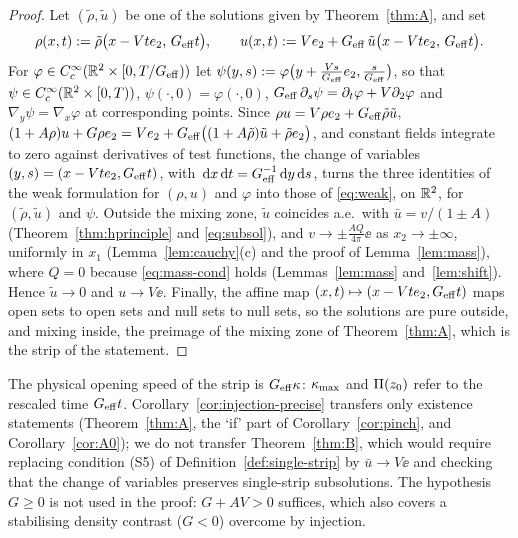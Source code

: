 \begin{proof}
Let $(\tilde\rho,\tilde u)$ be one of the solutions given by Theorem~\ref{thm:A}, and set
\[
\rho(x,t):=\tilde\rho\big(x-Vte_2,\,G_{\rm eff}t\big),\qquad u(x,t):=Ve_2+G_{\rm eff}\,\tilde u\big(x-Vte_2,\,G_{\rm eff}t\big).
\]
For $\varphi\in C^\infty_c(\mathbb{R}^2\times[0,T/G_{\rm eff}))$ let $\psi(y,s):=\varphi\big(y+\frac{Vs}{G_{\rm eff}}e_2,\frac{s}{G_{\rm eff}}\big)$, so that $\psi\in C^\infty_c(\mathbb{R}^2\times[0,T))$,
$\psi(\cdot,0)=\varphi(\cdot,0)$, $G_{\rm eff}\,\partial_s\psi=\partial_t\varphi+V\partial_2\varphi$ and $\nabla_y\psi=\nabla_x\varphi$ at corresponding points. Since $\rho u=V\rho e_2+G_{\rm eff}\tilde\rho\tilde u$,
$(1+A\rho)u+G\rho e_2=Ve_2+G_{\rm eff}\big((1+A\tilde\rho)\tilde u+\tilde\rho e_2\big)$, and constant fields integrate to zero against derivatives of test functions, the change of variables
$(y,s)=(x-Vte_2,G_{\rm eff}t)$, with $\,\mathrm{d} x\,\mathrm{d} t=G_{\rm eff}^{-1}\,\mathrm{d} y\,\mathrm{d} s$, turns the three identities of the weak formulation for $(\rho,u)$ and $\varphi$ into those of \eqref{eq:weak}, on $\mathbb{R}^2$, for
$(\tilde\rho,\tilde u)$ and $\psi$. Outside the mixing zone, $\tilde u$ coincides a.e.\ with $\bar u=v/(1\pm A)$ (Theorem~\ref{thm:hprinciple} and \eqref{eq:subsol}), and $v\to\pm\frac{AQ}{4\pi}\ee$ as
$x_2\to\pm\infty$, uniformly in $x_1$ (Lemma~\ref{lem:cauchy}(c) and the proof of Lemma~\ref{lem:mass}), where $Q=0$ because \eqref{eq:mass-cond} holds (Lemmas~\ref{lem:mass} and~\ref{lem:shift}).
Hence $\tilde u\to0$ and $u\to V\ee$. Finally, the affine map $(x,t)\mapsto(x-Vte_2,G_{\rm eff}t)$ maps open sets to open sets and null sets to null sets, so the solutions are pure outside, and mixing
inside, the preimage of the mixing zone of Theorem~\ref{thm:A}, which is the strip of the statement.
\end{proof}

The physical opening speed of the strip is $G_{\rm eff}\kappa$: $\kappa_{\max}$ and $\Pi(z_0)$ refer to the rescaled time $G_{\rm eff}t$. Corollary~\ref{cor:injection-precise} transfers only existence
statements (Theorem~\ref{thm:A}, the `if' part of Corollary~\ref{cor:pinch}, and Corollary~\ref{cor:A0}); we do not transfer Theorem~\ref{thm:B}, which would require replacing condition (S5) of
Definition~\ref{def:single-strip} by $\bar u\to V\ee$ and checking that the change of variables preserves single-strip subsolutions. The hypothesis $G\ge0$ is not used in the proof: $G+AV>0$ suffices,
which also covers a stabilising density contrast ($G<0$) overcome by injection.

